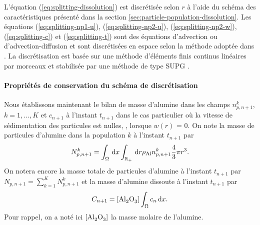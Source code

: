 L'équation (\ref{eq:splitting-dissolution}) est discrétisée selon $r$ à
l'aide du schéma des caractéristiques présenté dans la section
\ref{sec:particle-population-dissolution}. Les équations
(\ref{eq:splitting-np1-u}), (\ref{eq:splitting-np2-u}),
(\ref{eq:splitting-np2-w}), (\ref{eq:splitting-c}) et
(\ref{eq:splitting-t}) sont des équations d'advection ou
d'advection-diffusion et sont discrétisées en espace selon la méthode
adoptée dans \cite{Hofer2011}. La discrétisation est basée sur une
méthode d'éléments finis continus linéaires par morceaux et stabilisée
par une méthode de type SUPG \cite{Quarteroni2008}.

\paragraph{Propriétés de conservation du schéma de discrétisation}
Nous établissons maintenant le bilan de masse d'alumine dans les
champs $n_{p,n+1}^k$, $k = 1,\dots, K$ et $c_{n+1}$ à l'instant
$t_{n+1}$ dans le cas particulier où la vitesse de sédimentation des
particules est nulles, \ie, lorsque $w(r)$ = 0. On note la masse
de particules d'alumine dans la population $k$ à l'instant $t_{n+1}$ par
\begin{equation}\label{eq:np-masse-def}
  N_{p,n+1}^k = \int_\Omega \,\mathrm dx\int_{\mathbb R_+}\,\mathrm dr \rho_\mathrm{Al}
  n_{p,n+1}^k\frac{4}{3}\pi r^3.
\end{equation}
On notera encore la masse totale de particules d'alumine à l'instant
$t_{n+1}$ par $N_{p,n+1} =
\sum_{k = 1}^K N_{p,n+1}^k$ et la masse d'alumine dissoute à l'instant
$t_{n+1}$ par
\begin{equation}\label{eq:c-masse-def}
  C_{n+1} = [\cee{Al2O3}]\int_\Omega c_n\intd{x}.
\end{equation}
Pour rappel, on a noté ici $[\ce{Al2O3}]$ la masse molaire de l'alumine.

